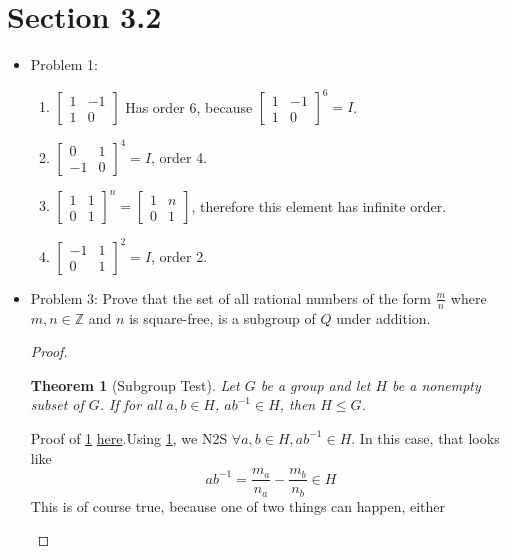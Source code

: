 \documentclass[hidelinks,12pt]{article}
\newtheorem{theorem}{Theorem}
\newcommand{\Z}{\mathbb{Z}}
\begin{document}
\section{Section 3.2}
\begin{itemize}
    \item Problem 1:\begin{enumerate}[label=(\alph*)]
        \item $\begin{bmatrix}
1 & -1\\
1 & 0
\end{bmatrix}$ Has order 6, because $\begin{bmatrix}
1 & -1\\
1 & 0
\end{bmatrix}^6=I$.
    \item $\begin{bmatrix}
0 & 1\\
-1 & 0
\end{bmatrix}^4=I$, order 4.
    \item $\begin{bmatrix}
1 & 1\\
0 & 1
\end{bmatrix}^n=\begin{bmatrix}
1 & n\\
0 & 1
\end{bmatrix}$, therefore this element has infinite order.
    \item $\begin{bmatrix}
-1 & 1\\
0 & 1
\end{bmatrix}^2=I$, order 2.
    \end{enumerate}
    \item Problem 3: Prove that the set of all rational numbers of the form $\frac{m}{n}$ where $m,n\in\Z$ and $n$ is square-free, is a subgroup of $Q$ under addition.\begin{proof} \begin{theorem}[Subgroup Test]\label{sgtest}Let $G$ be a group and let $H$ be a nonempty subset of $G$. If for all $a,b\in H$, $ab^{-1}\in H$, then $H\leqslant G$. \end{theorem}Proof of \ref{sgtest} \href{https://en.wikipedia.org/wiki/Subgroup_test}{\color{cyan}here}.\newline Using \ref{sgtest}, we N2S $\forall a,b\in H, ab^{-1}\in H$. In this case, that looks like $$ab^{-1}=\frac{m_a}{n_a}-\frac{m_b}{n_b}\in H$$This is of course true, because one of two things can happen, either \begin{enumerate}[label=(\roman*)]

\end{enumerate}
\end{proof}
\end{itemize}
\end{document}

